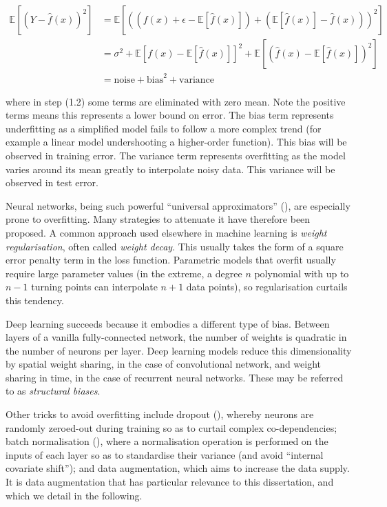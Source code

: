 \begin{align}
\mathbb{E}[(Y - \hat{f}(x))^2] &= \mathbb{E}[((f(x) + \epsilon - \mathbb{E}[\hat{f}(x)]) + (\mathbb{E}[\hat{f}(x)] - \hat{f}(x)))^2] \\
&= \sigma^2 + \mathbb{E}[f(x) - \mathbb{E}[\hat{f}(x)]]^2 + \mathbb{E}[(\hat{f}(x) - \mathbb{E}[\hat{f}(x)])^2] \\
&= \text{noise} + \text{bias}^2 + \text{variance}
\end{align}

where in step (1.2) some terms are eliminated with zero mean. Note the positive terms means this represents a lower bound on error. The bias term represents underfitting as a simplified model fails to follow a more complex trend (for example a linear model undershooting a higher-order function). This bias will be observed in training error. The variance term represents overfitting as the model varies around its mean greatly to interpolate noisy data. This variance will be observed in test error.

Neural networks, being such powerful ``universal approximators'' (\cite{hornik1989multilayer}), are especially prone to overfitting. Many strategies to attenuate it have therefore been proposed. A common approach used elsewhere in machine learning is \emph{weight regularisation}, often called \emph{weight decay}. This usually takes the form of a square error penalty term in the loss function. Parametric models that overfit usually require large parameter values (in the extreme, a degree $n$ polynomial with up to $n-1$ turning points can interpolate $n+1$ data points), so regularisation curtails this tendency.

Deep learning succeeds because it embodies a different type of bias. Between layers of a vanilla fully-connected network, the number of weights is quadratic in the number of neurons per layer. Deep learning models reduce this dimensionality by spatial weight sharing, in the case of convolutional network, and weight sharing in time, in the case of recurrent neural networks. These may be referred to as \emph{structural biases}.

Other tricks to avoid overfitting include dropout (\cite{srivastava2014dropout}), whereby neurons are randomly zeroed-out during training so as to curtail complex co-dependencies; batch normalisation (\cite{ioffe2015batch}), where a normalisation operation is performed on the inputs of each layer so as to standardise their variance (and avoid ``internal covariate shift''); and data augmentation, which aims to increase the data supply. It is data augmentation that has particular relevance to this dissertation, and which we detail in the following.

